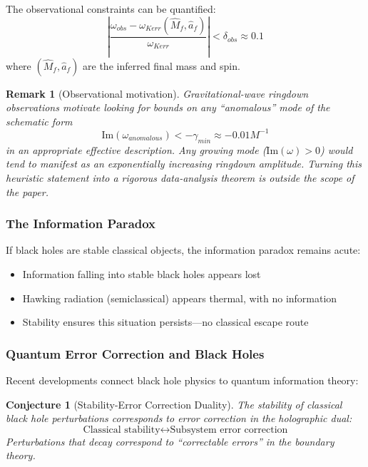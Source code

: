 \documentclass[12pt,a4paper]{article}
\newtheorem{remark}[theorem]{Remark}
\newtheorem{conjecture}[theorem]{Conjecture}
\begin{document}
The observational constraints can be quantified:
\begin{equation}
\left|\frac{\omega_{obs} - \omega_{Kerr}(\hat{M}_f, \hat{a}_f)}{\omega_{Kerr}}\right| < \delta_{obs} \approx 0.1
\end{equation}
where $(\hat{M}_f, \hat{a}_f)$ are the inferred final mass and spin.

\begin{remark}[Observational motivation]
Gravitational-wave ringdown observations motivate looking for bounds on any ``anomalous'' mode of the schematic form
\begin{equation}
\text{Im}(\omega_{anomalous}) < -\gamma_{min} \approx -0.01 M^{-1}
\end{equation}
in an appropriate effective description. Any growing mode ($\text{Im}(\omega) > 0$) would tend to manifest as an exponentially increasing ringdown amplitude. Turning this heuristic statement into a rigorous data-analysis theorem is outside the scope of the paper.
\end{remark}

\subsubsection{The Information Paradox}

If black holes are stable classical objects, the information paradox remains acute:
\begin{itemize}
    \item Information falling into stable black holes appears lost
    \item Hawking radiation (semiclassical) appears thermal, with no information
    \item Stability ensures this situation persists---no classical escape route
\end{itemize}

\subsubsection{Quantum Error Correction and Black Holes}

Recent developments connect black hole physics to quantum information theory:

\begin{conjecture}[Stability-Error Correction Duality]
The stability of classical black hole perturbations corresponds to error correction in the holographic dual:
\begin{equation}
\text{Classical stability} \leftrightarrow \text{Subsystem error correction}
\end{equation}
Perturbations that decay correspond to ``correctable errors'' in the boundary theory.
\end{conjecture}
\end{document}
